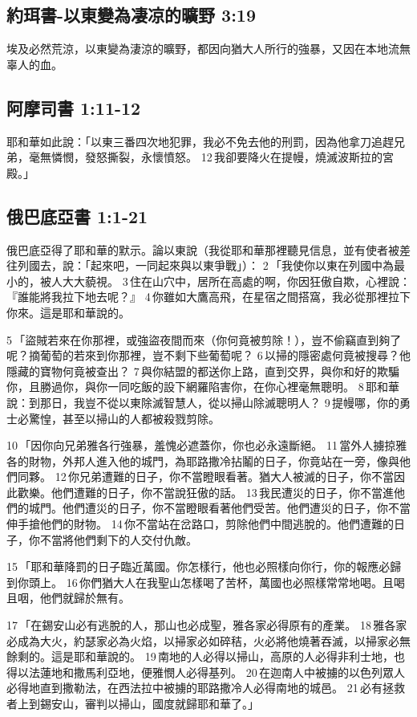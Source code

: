 \subsection{約珥書-以東變為凄凉的曠野 3:19}
埃及必然荒涼，以東變為淒涼的曠野，都因向猶大人所行的強暴，又因在本地流無辜人的血。

\subsection{阿摩司書 1:11-12}
耶和華如此說：「以東三番四次地犯罪，我必不免去他的刑罰，因為他拿刀追趕兄弟，毫無憐憫，發怒撕裂，永懷憤怒。 12 我卻要降火在提幔，燒滅波斯拉的宮殿。」

\subsection{俄巴底亞書 1:1-21}

俄巴底亞得了耶和華的默示。論以東說（我從耶和華那裡聽見信息，並有使者被差往列國去，說：「起來吧，一同起來與以東爭戰」）： 2 「我使你以東在列國中為最小的，被人大大藐視。 3 住在山穴中，居所在高處的啊，你因狂傲自欺，心裡說：『誰能將我拉下地去呢？』 4 你雖如大鷹高飛，在星宿之間搭窩，我必從那裡拉下你來。這是耶和華說的。

5 「盜賊若來在你那裡，或強盜夜間而來（你何竟被剪除！），豈不偷竊直到夠了呢？摘葡萄的若來到你那裡，豈不剩下些葡萄呢？ 6 以掃的隱密處何竟被搜尋？他隱藏的寶物何竟被查出？ 7 與你結盟的都送你上路，直到交界，與你和好的欺騙你，且勝過你，與你一同吃飯的設下網羅陷害你，在你心裡毫無聰明。 8 耶和華說：到那日，我豈不從以東除滅智慧人，從以掃山除滅聰明人？ 9 提幔哪，你的勇士必驚惶，甚至以掃山的人都被殺戮剪除。

10 「因你向兄弟雅各行強暴，羞愧必遮蓋你，你也必永遠斷絕。 11 當外人擄掠雅各的財物，外邦人進入他的城門，為耶路撒冷拈鬮的日子，你竟站在一旁，像與他們同夥。 12 你兄弟遭難的日子，你不當瞪眼看著。猶大人被滅的日子，你不當因此歡樂。他們遭難的日子，你不當說狂傲的話。 13 我民遭災的日子，你不當進他們的城門。他們遭災的日子，你不當瞪眼看著他們受苦。他們遭災的日子，你不當伸手搶他們的財物。 14 你不當站在岔路口，剪除他們中間逃脫的。他們遭難的日子，你不當將他們剩下的人交付仇敵。

15 「耶和華降罰的日子臨近萬國。你怎樣行，他也必照樣向你行，你的報應必歸到你頭上。 16 你們猶大人在我聖山怎樣喝了苦杯，萬國也必照樣常常地喝。且喝且咽，他們就歸於無有。

17 「在錫安山必有逃脫的人，那山也必成聖，雅各家必得原有的產業。 18 雅各家必成為大火，約瑟家必為火焰，以掃家必如碎秸，火必將他燒著吞滅，以掃家必無餘剩的。這是耶和華說的。 19 南地的人必得以掃山，高原的人必得非利士地，也得以法蓮地和撒馬利亞地，便雅憫人必得基列。 20 在迦南人中被擄的以色列眾人必得地直到撒勒法，在西法拉中被擄的耶路撒冷人必得南地的城邑。 21 必有拯救者上到錫安山，審判以掃山，國度就歸耶和華了。」

